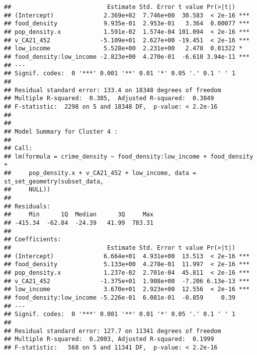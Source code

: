 \documentclass[
]{article}
\begin{document}
\begin{verbatim}
##                           Estimate Std. Error t value Pr(>|t|)    
## (Intercept)              2.369e+02  7.746e+00  30.583  < 2e-16 ***
## food_density             9.935e-01  2.953e-01   3.364  0.00077 ***
## pop_density.x            1.591e-02  1.574e-04 101.094  < 2e-16 ***
## v_CA21_452              -5.109e+01  2.627e+00 -19.451  < 2e-16 ***
## low_income               5.528e+00  2.231e+00   2.478  0.01322 *  
## food_density:low_income -2.823e+00  4.270e-01  -6.610 3.94e-11 ***
## ---
## Signif. codes:  0 '***' 0.001 '**' 0.01 '*' 0.05 '.' 0.1 ' ' 1
## 
## Residual standard error: 133.4 on 18348 degrees of freedom
## Multiple R-squared:  0.385,  Adjusted R-squared:  0.3849 
## F-statistic:  2298 on 5 and 18348 DF,  p-value: < 2.2e-16
## 
## 
## Model Summary for Cluster 4 :
## 
## Call:
## lm(formula = crime_density ~ food_density:low_income + food_density + 
##     pop_density.x + v_CA21_452 + low_income, data = st_set_geometry(subset_data, 
##     NULL))
## 
## Residuals:
##     Min      1Q  Median      3Q     Max 
## -415.34  -62.84  -24.39   41.99  783.31 
## 
## Coefficients:
##                           Estimate Std. Error t value Pr(>|t|)    
## (Intercept)              6.664e+01  4.931e+00  13.513  < 2e-16 ***
## food_density             5.133e+00  4.278e-01  11.997  < 2e-16 ***
## pop_density.x            1.237e-02  2.701e-04  45.811  < 2e-16 ***
## v_CA21_452              -1.375e+01  1.908e+00  -7.206 6.13e-13 ***
## low_income               3.670e+01  2.923e+00  12.556  < 2e-16 ***
## food_density:low_income -5.226e-01  6.081e-01  -0.859     0.39    
## ---
## Signif. codes:  0 '***' 0.001 '**' 0.01 '*' 0.05 '.' 0.1 ' ' 1
## 
## Residual standard error: 127.7 on 11341 degrees of freedom
## Multiple R-squared:  0.2003, Adjusted R-squared:  0.1999 
## F-statistic:   568 on 5 and 11341 DF,  p-value: < 2.2e-16
\end{verbatim}
\end{document}

